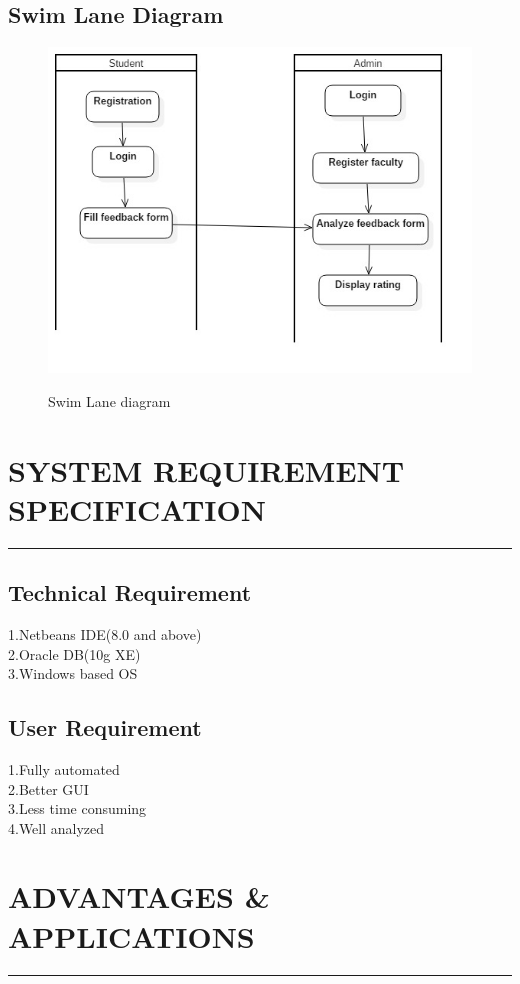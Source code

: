 \documentclass[12 pt,a4paper]{report}
\begin{document}
\section{Swim Lane Diagram}
\begin{figure}[ht]
\begin{center}
\includegraphics[scale=.5]{swim.png}\\
\caption{Swim Lane diagram}
\end{center}
\end{figure}

\chapter{SYSTEM REQUIREMENT SPECIFICATION}

\rule{\textwidth}{2 pt}
\justify
\section{Technical Requirement}
1.Netbeans IDE(8.0 and above)\\
2.Oracle DB(10g XE)\\
3.Windows based OS
\section{User Requirement}
1.Fully automated\\
2.Better GUI\\
3.Less time consuming\\
4.Well analyzed
\chapter{ADVANTAGES \& APPLICATIONS}
\rule{\textwidth}{2 pt}
\justify
\end{document}

